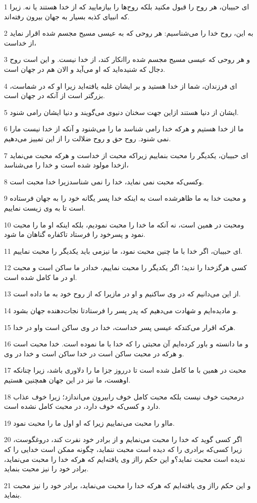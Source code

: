 \par 1 ای حبیبان، هر روح را قبول مکنید بلکه روح‌ها را بیازمایید که از خدا هستند یا نه. زیرا که انبیای کذبه بسیار به جهان بیرون رفته‌اند.
\par 2 به این، روح خدا را می‌شناسیم: هر روحی که به عیسی مسیح مجسم شده اقرار نماید از خداست،
\par 3 و هر روحی که عیسی مسیح مجسم شده راانکار کند، از خدا نیست. و این است روح دجال که شنیده‌اید که او می‌آید و الان هم در جهان است.
\par 4 ‌ای فرزندان، شما از خدا هستید و بر ایشان غلبه یافته‌اید زیرا او که در شماست، بزرگتر است از آنکه در جهان است.
\par 5 ایشان از دنیا هستند ازاین جهت سخنان دنیوی می‌گویند و دنیا ایشان رامی شنود.
\par 6 ما از خدا هستیم و هرکه خدا رامی شناسد ما را می‌شنود و آنکه از خدا نیست مارا نمی شنود. روح حق و روح ضلالت را از این تمییز می‌دهیم.
\par 7 ‌ای حبیبان، یکدیگر را محبت بنماییم زیراکه محبت از خداست و هرکه محبت می‌نماید ازخدا مولود شده است و خدا را می‌شناسد،
\par 8 وکسی‌که محبت نمی نماید، خدا را نمی شناسدزیرا خدا محبت است.
\par 9 و محبت خدا به ما ظاهرشده است به اینکه خدا پسر یگانه خود را به جهان فرستاده است تا به وی زیست نماییم.
\par 10 ومحبت در همین است، نه آنکه ما خدا را محبت نمودیم، بلکه اینکه او ما را محبت نمود و پسرخود را فرستاد تاکفاره گناهان ما شود.
\par 11 ‌ای حبیبان، اگر خدا با ما چنین محبت نمود، ما نیزمی باید یکدیگر را محبت نماییم.
\par 12 کسی هرگزخدا را ندید؛ اگر یکدیگر را محبت نماییم، خدادر ما ساکن است و محبت او در ما کامل شده است.
\par 13 از این می‌دانیم که در وی ساکنیم و او در مازیرا که از روح خود به ما داده است.
\par 14 و مادیده‌ایم و شهادت می‌دهیم که پدر پسر را فرستادتا نجات‌دهنده جهان بشود.
\par 15 هرکه اقرار می‌کندکه عیسی پسر خداست، خدا در وی ساکن است واو در خدا.
\par 16 و ما دانسته و باور کرده‌ایم آن محبتی را که خدا با ما نموده است. خدا محبت است و هرکه در محبت ساکن است در خدا ساکن است و خدا در وی.
\par 17 محبت در همین با ما کامل شده است تا درروز جزا ما را دلاوری باشد، زیرا چنانکه اوهست، ما نیز در این جهان همچنین هستیم.
\par 18 درمحبت خوف نیست بلکه محبت کامل خوف رابیرون می‌اندازد؛ زیرا خوف عذاب دارد و کسی‌که خوف دارد، در محبت کامل نشده است.
\par 19 مااو را محبت می‌نماییم زیرا که او اول ما را محبت نمود.
\par 20 اگر کسی گوید که خدا را محبت می‌نمایم و از برادر خود نفرت کند، دروغگوست، زیرا کسی‌که برادری را که دیده است محبت ننماید، چگونه ممکن است خدایی را که ندیده است محبت نماید؟و این حکم رااز وی یافته‌ایم که هرکه خدا را محبت می‌نماید، برادر خود را نیز محبت بنماید.
\par 21 و این حکم رااز وی یافته‌ایم که هرکه خدا را محبت می‌نماید، برادر خود را نیز محبت بنماید.

